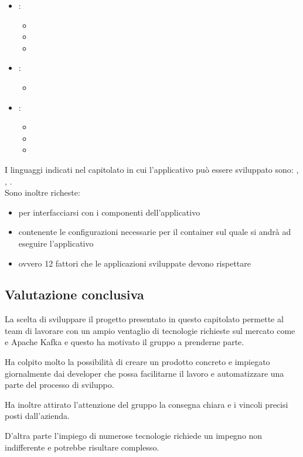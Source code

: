     \begin{itemize}
        \item {}:
        \begin{itemize}
            \item {}
            \item {}
            \item {}
        \end{itemize}
        \item {}:
        \begin{itemize}
            \item {}
        \end{itemize}
        \item {}:
        \begin{itemize}
            \item {}
            \item {}
            \item {}
        \end{itemize}
    \end{itemize}
    I linguaggi indicati nel capitolato in cui l'applicativo può essere sviluppato sono: , , .\\
    Sono inoltre richeste:
    \begin{itemize}
        \item {} per interfacciarsi con i componenti dell'applicativo
        \item {} contenente le configurazioni necessarie per il container sul quale si andrà ad eseguire l'applicativo
        \item {} ovvero 12 fattori che le applicazioni sviluppate devono rispettare
    \end{itemize}

    \subsection{Valutazione conclusiva}
    La scelta di sviluppare il progetto presentato in questo capitolato permette al team di lavorare con un ampio ventaglio di tecnologie
    richieste sul mercato come  e Apache Kafka e questo ha motivato il gruppo a prenderne parte.\par
    Ha colpito molto la possibilità di creare un prodotto concreto e impiegato giornalmente dai developer che possa facilitarne il lavoro
    e automatizzare una parte del processo di sviluppo.\par
    Ha inoltre attirato l'attenzione del gruppo la consegna chiara e i vincoli precisi posti dall'azienda.\par
    D'altra parte l'impiego di numerose tecnologie richiede un impegno non indifferente e potrebbe risultare complesso.
